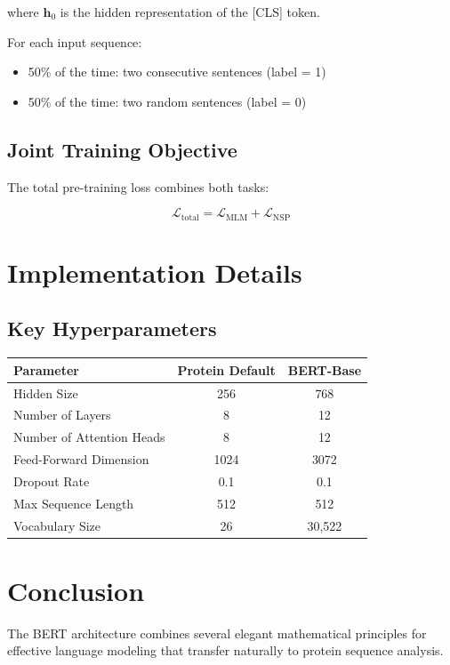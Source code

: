 \documentclass[11pt,a4paper]{article}
\begin{document}
where $\mathbf{h}_0$ is the hidden representation of the [CLS] token.

For each input sequence:
\begin{itemize}
    \item 50\% of the time: two consecutive sentences (label = 1)
    \item 50\% of the time: two random sentences (label = 0)
\end{itemize}

\subsection{Joint Training Objective}

The total pre-training loss combines both tasks:

\begin{equation}
\mathcal{L}_{\text{total}} = \mathcal{L}_{\text{MLM}} + \mathcal{L}_{\text{NSP}}
\end{equation}

\section{Implementation Details}

\subsection{Key Hyperparameters}

\begin{table}[H]
\centering
\begin{tabular}{|l|c|c|}
\hline
\textbf{Parameter} & \textbf{Protein Default} & \textbf{BERT-Base} \\
\hline
Hidden Size & 256 & 768 \\
Number of Layers & 8 & 12 \\
Number of Attention Heads & 8 & 12 \\
Feed-Forward Dimension & 1024 & 3072 \\
Dropout Rate & 0.1 & 0.1 \\
Max Sequence Length & 512 & 512 \\
Vocabulary Size & 26 & 30,522 \\
\hline
\end{tabular}
\end{table}

\section{Conclusion}

The BERT architecture combines several elegant mathematical principles for effective language modeling that transfer naturally to protein sequence analysis.
\end{document}
